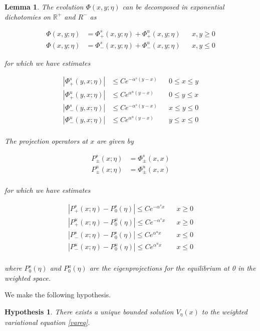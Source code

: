 \documentclass[12pt]{article}
\def\R{{\mathbb R}}
\newtheorem{lemma}{Lemma}
\newtheorem{hypothesis}{Hypothesis}
\begin{document}
\begin{lemma}\label{dichotomy}
The evolution $\Phi(x, y; \eta)$ can be decomposed in exponential dichotomies on $\R^+$ and $R^-$ as

\begin{align*}
\Phi(x, y; \eta) &= \Phi^s_+(x, y; \eta) + \Phi^u_+(x, y; \eta) && x, y \geq 0 \\
\Phi(x, y; \eta) &= \Phi^s_-(x, y; \eta) + \Phi^u_-(x, y; \eta) && x, y \leq 0 
\end{align*}

for which we have estimates

\begin{align*}
|\Phi^s_+(y,x; \eta)| &\leq Ce^{-\alpha^s(y-x)} && 0 \leq x \leq y \\
|\Phi^u_+(y,x; \eta)| &\leq Ce^{\alpha^u(y-x)}  && 0 \leq y \leq x \\
|\Phi^s_-(y,x; \eta)| &\leq Ce^{-\alpha^s(y-x)} && x \leq y \leq 0 \\
|\Phi^u_-(y,x; \eta)| &\leq Ce^{\alpha^u(y-x)}  && y \leq x \leq 0 \\
\end{align*}

The projection operators at $x$ are given by

\begin{align*}
P^s_\pm(x; \eta) &= \Phi^s_\pm(x,x)\\
P^u_\pm(x; \eta) &= \Phi^u_\pm(x,x)\\
\end{align*}

for which we have estimates

\begin{align*}
|P^s_+(x; \eta) - P_0^s(\eta)| \leq Ce^{-\alpha^s x} && x \geq 0 \\
|P^u_+(x; \eta) - P_0^u(\eta)| \leq Ce^{-\alpha^s x} && x \geq 0 \\
|P^s_-(x; \eta) - P_0^s(\eta)| \leq Ce^{\alpha^u x} && x \leq 0 \\
|P^u_-(x; \eta) - P_0^u(\eta)| \leq Ce^{\alpha^u x} && x \leq 0 \\
\end{align*}

where $P_0^s(\eta)$ and $P_0^u(\eta)$ are the eigenprojections for the equilibrium at 0 in the weighted space. 

\end{lemma}

We make the following hypothesis.

\begin{hypothesis}
There exists a unique bounded solution $V_\eta(x)$ to the weighted variational equation \eqref{vareq}.
\end{hypothesis}
\end{document}
